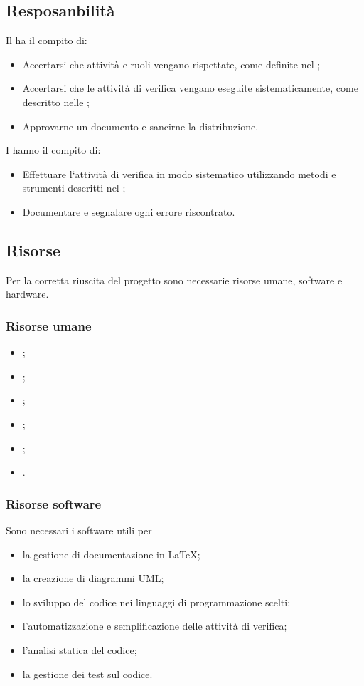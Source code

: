 	
	\subsection{Resposanbilità}
	Il \RdP ha il compito di:
	\begin{itemize}
		\item Accertarsi che attività e ruoli vengano rispettate, come definite nel \PdP;
		\item Accertarsi che le attività di verifica vengano eseguite sistematicamente, come descritto nelle \NdP;
		\item Approvarne un documento e sancirne la distribuzione.
	\end{itemize}

	I \Vers hanno il compito di:
	\begin{itemize}
		\item Effettuare l‘attività di verifica in modo sistematico utilizzando metodi e strumenti descritti nel \PdQ;
		\item Documentare e segnalare ogni errore riscontrato.
	\end{itemize}	
	
	
	\subsection{Risorse}
	Per la corretta riuscita del progetto sono necessarie risorse umane, software e hardware.
	
		\subsubsection{Risorse umane}
		\begin{itemize}
			\item \RdP;
			\item \Res;
			\item \Amm;
			\item \Ver;
			\item \Prog;
			\item \Ana.
		\end{itemize}
		
		\subsubsection{Risorse software}
		Sono necessari i software utili per
		\begin{itemize}
			\item la gestione di documentazione in \LaTeX;
			\item la creazione di diagrammi UML;
			\item lo sviluppo del codice nei linguaggi di programmazione scelti;
			\item l'automatizzazione e semplificazione delle attività di verifica;
			\item l'analisi statica del codice;
			\item la gestione dei test sul codice.
		\end{itemize}
		
